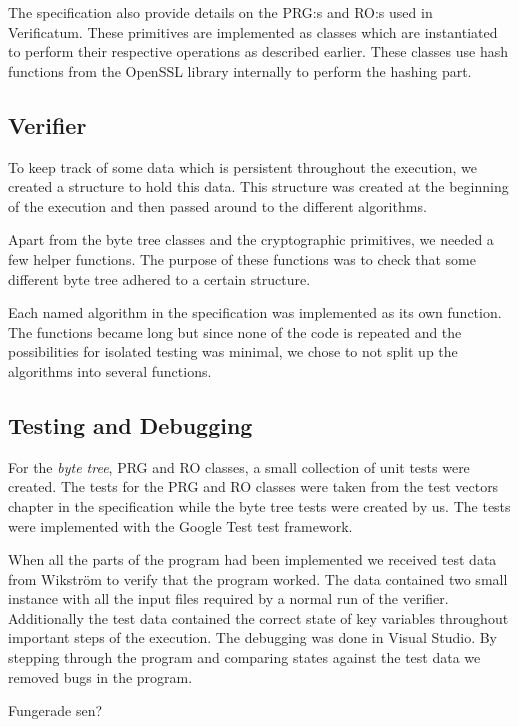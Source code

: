 The specification also provide details on the PRG:s and RO:s used in
Verificatum. These primitives are implemented as classes which are
instantiated to perform their respective operations as described
earlier. These classes use hash functions from the OpenSSL library
internally to perform the hashing part.

\subsection{Verifier}

To keep track of some data which is persistent throughout the
execution, we created a structure to hold this data. This structure
was created at the beginning of the execution and then passed around
to the different algorithms.

Apart from the byte tree classes and the cryptographic primitives, we
needed a few helper functions. The purpose of these functions was to
check that some different byte tree adhered to a certain structure.

Each named algorithm in the specification was implemented as its own
function. The functions became long but since none of the code is
repeated and the possibilities for isolated testing was minimal, we
chose to not split up the algorithms into several functions.

\subsection{Testing and Debugging}

For the \emph{byte tree}, PRG and RO classes, a small collection of
unit tests were created. The tests for the PRG and RO classes were
taken from the test vectors chapter in the specification while the
byte tree tests were created by us. The tests were implemented with
the Google Test test framework.

When all the parts of the program had been implemented we received
test data from Wikström to verify that the program worked. The data
contained two small instance with all the input files required by a
normal run of the verifier. Additionally the test data contained the
correct state of key variables throughout important steps of the
execution. The debugging was done in Visual Studio. By stepping
through the program and comparing states against the test data we
removed bugs in the program.

Fungerade sen?
